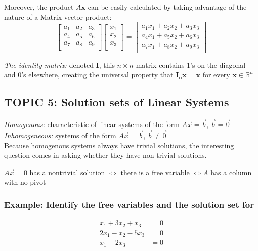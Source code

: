 \documentclass[12pt]{article} %
\newcommand{\R}{\mathbb{R}}
\newcommand{\mateq}{$A \vec{x} = \vec{b}$}
\begin{document}
Moreover, the product $A\mathbf{x}$ can be easily calculated by taking advantage of the nature of a Matrix-vector product:
$$\begin{bmatrix}
	a_1 & a_2 & a_3\\
	a_4 & a_5 & a_6\\
	a_7 & a_8 & a_9\\
\end{bmatrix}\begin{bmatrix}
	x_1\\
	x_2\\
	x_3\\
\end{bmatrix} = \begin{bmatrix}
	a_1 x_1 + a_2 x_2 + a_3 x_3\\
	a_4 x_1 + a_5 x_2 + a_6 x_3\\
	a_7 x_1 + a_8 x_2 + a_9 x_3\\
\end{bmatrix}$$

\emph{The identity matrix:} denoted $\mathbf{I}$, this $n\times n$ matrix contains 1's on the diagonal and 0's elsewhere, creating the universal property that $\mathbf{I_n x} = \mathbf{x} \text{  for every  } \mathbf{x} \in \R^n$

\pagebreak
\subsection{TOPIC 5: Solution sets of Linear Systems}
\emph{Homogenous:} characteristic of linear systems of the form \mateq, $\vec{b} = \vec{0}$\\

\emph{Inhomogeneous:} systems of the form \mateq, $\vec{b} \neq \vec{0}$\\

Because homogenous systems always have trivial solutions, the interesting question comes in asking whether they have non-trivial solutions.


\begin{center}
	$A \vec{x} = 0$ has a nontrivial solution $\iff$ there is a free variable $\iff A$ has a column with no pivot
\end{center}


\subsubsection{Example: Identify the free variables and the solution set for}
\begin{align*}
	x_1 + 3x_2 + x_3 &= 0\\
	2x_1 - x_2 - 5x_3 &= 0\\
	x_1 - 2x_3 &= 0
\end{align*}
\end{document}
